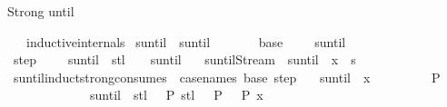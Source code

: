 \begin{isabellebody}
\begin{isamarkuptext}
Strong until%
\end{isamarkuptext}\isamarkuptrue%
\isamarkupfalse%
\isanewline
\ \ \ {\isacharbrackleft}{\isacharbrackleft}inductive{\isacharunderscore}internals{\isacharbrackright}{\isacharbrackright}\isanewline
{}\isanewline
\isanewline
{}\isamarkupfalse%
\ suntil\ {\isacharparenleft}\ {\isachardoublequoteopen}suntil{\isachardoublequoteclose}\ {}{}{\isacharparenright}\ \ {\isasymphi}\ {\isasympsi}\ \isanewline
\ \ base{\isacharcolon}\ {\isachardoublequoteopen}{\isasympsi}\ {\isasymomega}\ {\isasymLongrightarrow}\ {\isacharparenleft}{\isasymphi}\ suntil\ {\isasympsi}{\isacharparenright}\ {\isasymomega}{\isachardoublequoteclose}\isanewline
{\isacharbar}\ step{\isacharcolon}\ {\isachardoublequoteopen}{\isasymphi}\ {\isasymomega}\ {\isasymLongrightarrow}\ {\isacharparenleft}{\isasymphi}\ suntil\ {\isasympsi}{\isacharparenright}\ {\isacharparenleft}stl\ {\isasymomega}{\isacharparenright}\ {\isasymLongrightarrow}\ {\isacharparenleft}{\isasymphi}\ suntil\ {\isasympsi}{\isacharparenright}\ {\isasymomega}{\isachardoublequoteclose}\isanewline
\isanewline
{}\isamarkupfalse%
\ suntil{\isacharunderscore}Stream{\isacharcolon}\ {\isachardoublequoteopen}{\isacharparenleft}{\isasymphi}\ suntil\ {\isasympsi}{\isacharparenright}\ {\isacharparenleft}x\ {\isacharhash}{\isacharhash}\ s{\isacharparenright}{\isachardoublequoteclose}\isanewline
\isanewline
{}\isamarkupfalse%
\isanewline
\isanewline
{}\isamarkupfalse%
\ suntil{\isacharunderscore}induct{\isacharunderscore}strong{\isacharbrackleft}consumes\ {}{\isacharcomma}\ case{\isacharunderscore}names\ base\ step{\isacharbrackright}{\isacharcolon}\isanewline
\ \ {\isachardoublequoteopen}{\isacharparenleft}{\isasymphi}\ suntil\ {\isasympsi}{\isacharparenright}\ x\ {\isasymLongrightarrow}\isanewline
\ \ \ \ {\isacharparenleft}{\isasymAnd}{\isasymomega}{\isachardot}\ {\isasympsi}\ {\isasymomega}\ {\isasymLongrightarrow}\ P\ {\isasymomega}{\isacharparenright}\ {\isasymLongrightarrow}\isanewline
\ \ \ \ {\isacharparenleft}{\isasymAnd}{\isasymomega}{\isachardot}\ {\isasymphi}\ {\isasymomega}\ {\isasymLongrightarrow}\ {\isasymnot}\ {\isasympsi}\ {\isasymomega}\ {\isasymLongrightarrow}\ {\isacharparenleft}{\isasymphi}\ suntil\ {\isasympsi}{\isacharparenright}\ {\isacharparenleft}stl\ {\isasymomega}{\isacharparenright}\ {\isasymLongrightarrow}\ P\ {\isacharparenleft}stl\ {\isasymomega}{\isacharparenright}\ {\isasymLongrightarrow}\ P\ {\isasymomega}{\isacharparenright}\ {\isasymLongrightarrow}\ P\ x{\isachardoublequoteclose}\isanewline

\end{isabellebody}
